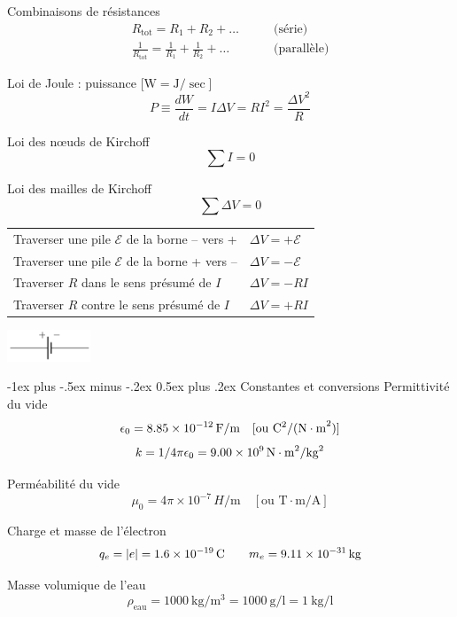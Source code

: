 \documentclass[10pt,landscape]{article}
\makeatletter
\renewcommand{\section}{\@startsection{section}{1}{0mm}%
                                {-1ex plus -.5ex minus -.2ex}%
                                {0.5ex plus .2ex}%
                                {\normalfont\large\bfseries}}
\newcommand{\tableindent}{\hspace{1.5em}}
\newcommand{\emf}{\ensuremath{\mathcal{E}}}
\makeatother
\begin{document}
\begin{multicols}{3}
Combinaisons de résistances
\begin{align*}
R_\text{tot} = R_1 + R_2 + \dots \qquad & \text{(série)} \\
\frac{1}{R_\text{tot}} = \frac{1}{R_1} + \frac{1}{R_2} + \dots \qquad & \text{(parallèle)}
\end{align*}

Loi de Joule : puissance [$\si{\watt} = \si{\joule}/\si{\sec}$]
\[ P \equiv \frac{dW}{dt} = I \Delta V = R I^2  = \frac{\Delta V^2}{R}\]

Loi des nœuds de Kirchoff
\[ \sum I = 0 \]

Loi des mailles de Kirchoff
\[ \sum \Delta V = 0 \]

\begin{tabular}{@{\tableindent}ll@{}}
	Traverser une pile $\emf$ de la borne -- vers + & $\Delta V  = +\emf$ \\
	Traverser une pile $\emf$ de la borne + vers -- & $\Delta V  = -\emf$ \\
 	Traverser $R$ dans le sens présumé de $I$ & $\Delta V  = -RI$ \\
	Traverser $R$ contre le sens présumé de $I$ & $\Delta V  = +RI$ 
\end{tabular}

\begin{center}
	\includegraphics[width=25mm]{./phy1522/pile.png}
\end{center}

\hrulefill
\section{Constantes et conversions}
Permittivité du vide
\[ 	\epsilon_0 = \SI{8,85E-12}{{\farad}/{\meter}} \quad [\text{ou } \si{{\coulomb^2}/{(\newton\cdot\meter^2)}}] \]
\[	k = {1}/{4\pi\epsilon_0} = \SI{9,00E9}{\newton\cdot\meter^2/\kilogram^2}\]

Perméabilité du vide
\[ \mu_0 = 4\pi \times 10^{-7} \,\si{H/\meter} \quad [\text{ou }\si{\tesla\cdot\meter/\ampere}] \]

Charge et masse de l'électron
\begin{gather*}
q_e = |e| = \SI{1,6E-19}{\coulomb}
\qquad m_e = \SI{9,11E-31}{\kilogram}
\end{gather*}

Masse volumique de l'eau
\[ \rho_\text{eau} = \SI{1000}{\kilogram/\meter^3} = \SI{1000}{\gram/\litre}  = \SI{1}{\kilogram/\litre} \]


\end{multicols}
\end{document}
